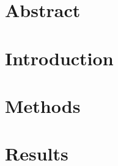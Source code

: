\documentclass{report}
\begin{document}
\section{Abstract}
\section{Introduction}
\section{Methods}


\section{Results}
\end{document}
